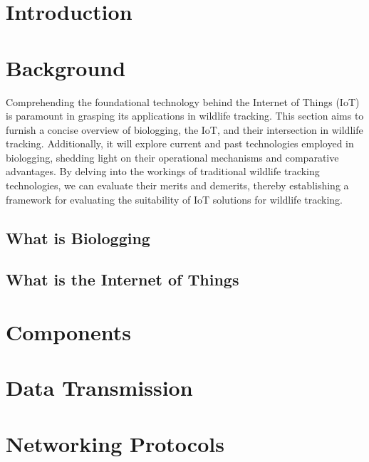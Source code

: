 \documentclass[sigplan,screen,nonacm]{acmart}
\begin{document}
\section{Introduction}
\label{sec:introduction}

\section{Background}
\label{sec:Background}

Comprehending the foundational technology behind the Internet of Things (IoT) 
is paramount in grasping its applications in wildlife tracking. This section 
aims to furnish a concise overview of biologging, the IoT, and their 
intersection in wildlife tracking. Additionally, it will explore current and past 
technologies employed in biologging, shedding light on their operational 
mechanisms and comparative advantages. By delving into the workings of 
traditional wildlife tracking technologies, we can evaluate their merits and 
demerits, thereby establishing a framework for evaluating the suitability of 
IoT solutions for wildlife tracking.

\subsection{What is Biologging}
\label{subsec:What is Biologging}

\subsection{What is the Internet of Things}
\label{subsec:What is the Internet of Things}

\section{Components}
\label{sec:Components}

\section{Data Transmission}
\label{sec:Data Transmission}

\section{Networking Protocols}
\label{sec:Networking Protocols}
\end{document}
